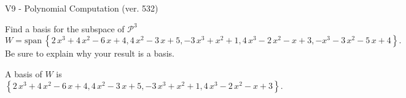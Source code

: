 \begin{exercise}
  \begin{exerciseTitle}V9 - Polynomial Computation (ver. 532)\end{exerciseTitle}
  \begin{exerciseStatement}
    Find a basis for the subspace of \(\mathcal{P}^3\) 
\[W=\mathrm{span}\ \left\{2 \, x^{3} + 4 \, x^{2} - 6 \, x + 4 , 4 \, x^{2} - 3 \, x + 5 , -3 \, x^{3} + x^{2} + 1 , 4 \, x^{3} - 2 \, x^{2} - x + 3 , -x^{3} - 3 \, x^{2} - 5 \, x + 4\right\}.\]
 Be sure to explain why your result is a basis.


  \end{exerciseStatement}
  \begin{exerciseAnswer}
   A basis of \(W\) is  \(\left\{2 \, x^{3} + 4 \, x^{2} - 6 \, x + 4 , 4 \, x^{2} - 3 \, x + 5 , -3 \, x^{3} + x^{2} + 1 , 4 \, x^{3} - 2 \, x^{2} - x + 3\right\}\).
  


  \end{exerciseAnswer}
\end{exercise}
